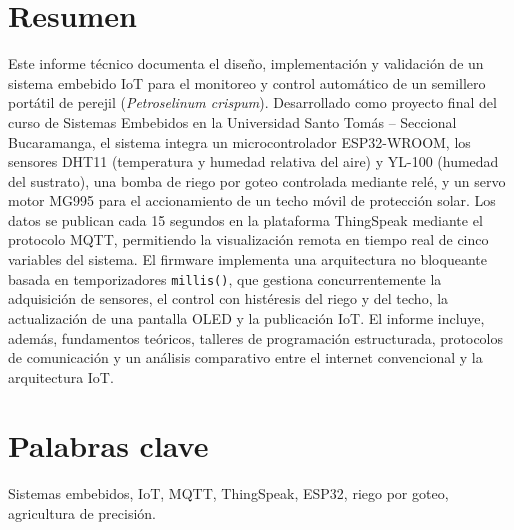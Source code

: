 \section*{Resumen}
Este informe técnico documenta el diseño, implementación y validación de un sistema embebido IoT para el monitoreo y control automático de un semillero portátil de perejil (\textit{Petroselinum crispum}). Desarrollado como proyecto final del curso de Sistemas Embebidos en la Universidad Santo Tomás – Seccional Bucaramanga, el sistema integra un microcontrolador ESP32-WROOM, los sensores DHT11 (temperatura y humedad relativa del aire) y YL-100 (humedad del sustrato), una bomba de riego por goteo controlada mediante relé, y un servo motor MG995 para el accionamiento de un techo móvil de protección solar. Los datos se publican cada 15 segundos en la plataforma ThingSpeak mediante el protocolo MQTT, permitiendo la visualización remota en tiempo real de cinco variables del sistema. El firmware implementa una arquitectura no bloqueante basada en temporizadores \texttt{millis()}, que gestiona concurrentemente la adquisición de sensores, el control con histéresis del riego y del techo, la actualización de una pantalla OLED y la publicación IoT. El informe incluye, además, fundamentos teóricos, talleres de programación estructurada, protocolos de comunicación y un análisis comparativo entre el internet convencional y la arquitectura IoT.

\section*{Palabras clave}
Sistemas embebidos, IoT, MQTT, ThingSpeak, ESP32, riego por goteo, agricultura de precisión.
